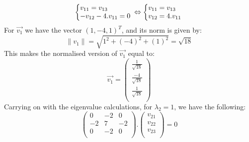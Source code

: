 \documentclass[600paper, 11pt,twoside,openany]{kdp}
\begin{document}
\[
  \left\{\begin{array}{@{}l@{}}
  v_{11} = v_{13}\\   
  -v_{12}-4.v_{11} = 0\\
  \end{array}\right.\,
   \Leftrightarrow
  \left\{\begin{array}{@{}l@{}}
  v_{11} = v_{13}\\   
  v_{12}=4.v_{11} \\
  \end{array}\right.\,
\]
\indent For $\overrightarrow{v_1}$ we have the vector $(
1,-4,1 )^T$, and its norm is given by: 
\[\| v_1 \| = \sqrt{1^2 + (-4)^2 + (1)^2} = \sqrt{18}\]
\indent This makes the normalised version of $\overrightarrow{v_1}$ equal to:
\[
\overrightarrow{v_1} = \begin{pmatrix}
\frac{1}{\sqrt{18}} \\
\frac{-4}{\sqrt{18}} \\
\frac{1}{\sqrt{18}} \\
\end{pmatrix}
\]
\indent Carrying on with the eigenvalue calculations, for $\lambda_2 = 1$, we have the following:
\[
\begin{pmatrix}
0 & -2 & 0 \\
-2 & 7 & -2 \\
0 & -2 & 0 \\
\end{pmatrix}.
\begin{pmatrix}
v_{21}\\
v_{22}\\
v_{23} \\
\end{pmatrix} = 0 
\]
\end{document}
